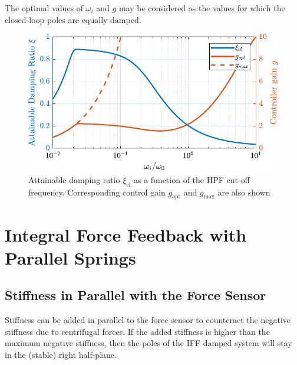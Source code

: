 \documentclass{ISMA_USD2020}
\begin{document}
The optimal values of \(\omega_i\) and \(g\) may be considered as the values for which the closed-loop poles are equally damped.

\begin{figure}[htbp]
\centering
\includegraphics[scale=1]{figs/mod_iff_damping_wi.pdf}
\caption{\label{fig:mod_iff_damping_wi}Attainable damping ratio \(\xi_\text{cl}\) as a function of the HPF cut-off frequency. Corresponding control gain \(g_\text{opt}\) and \(g_\text{max}\) are also shown}
\end{figure}

\section{Integral Force Feedback with Parallel Springs}
\label{sec:org8681b34}
\label{sec:iff_kp}
\subsection{Stiffness in Parallel with the Force Sensor}
\label{sec:org0dff3a7}
Stiffness can be added in parallel to the force sensor to counteract the negative stiffness due to centrifugal forces.
If the added stiffness is higher than the maximum negative stiffness, then the poles of the IFF damped system will stay in the (stable) right half-plane.
\end{document}
